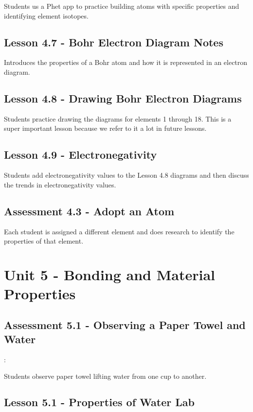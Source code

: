 \documentclass[12pt]{article}
\begin{document}
Students us a Phet app to practice building atoms with specific
properties and identifying element isotopes.

\subsection{Lesson 4.7 - Bohr Electron Diagram Notes} 

Introduces the properties of a Bohr atom and how it is represented in an electron diagram.

\subsection{Lesson 4.8 - Drawing Bohr Electron Diagrams} 

Students practice drawing the diagrams
for elements 1 through 18. This is a super important lesson because we refer to it a lot in
future lessons.

\subsection{Lesson 4.9 - Electronegativity} 

Students add electronegativity values to the Lesson 4.8
diagrams and then discuss the trends in electronegativity values.

\subsection*{Assessment 4.3 - Adopt an Atom}

Each student is assigned a different element and does research to identify the properties of that element.

\section{Unit 5 - Bonding and Material Properties}

\subsection*{Assessment 5.1 - Observing a Paper Towel and Water}: 

Students observe paper towel lifting water from one cup to another.

\subsection{Lesson 5.1 - Properties of Water Lab} 
\end{document}
